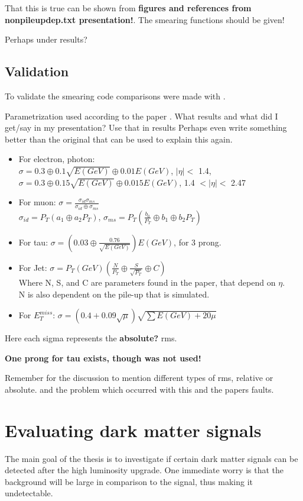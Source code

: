 That this is true can be shown from \textbf{figures and references from nonpileupdep.txt presentation!}. The smearing functions should be given!

Perhaps under results?
\subsection{Validation}
To validate the smearing code comparisons were made with \citep{ATL-PHYS-PUB-2013-004}. 

Parametrization used according to the paper \citep{ATL-PHYS-PUB-2013-004}. What results and what did I get/say in my presentation? Use that in results Perhaps even write something better than the original that can be used to explain this again.

\begin{itemize}
\item For electron, photon:\\
$\sigma=0.3\oplus 0.1\sqrt{E(GeV)}\oplus 0.01E(GeV)$, $|\eta|<$ 1.4, \\
$\sigma=0.3\oplus 0.15\sqrt{E(GeV)}\oplus 0.015E(GeV)$, 1.4 $<|\eta|<$ 2.47 
\item For muon: $\sigma=\frac{\sigma_{id} \sigma_{ms}}{\sigma_{id} \oplus \sigma_{ms}}$\\
$\sigma_{id}=P_T(a_1 \oplus a_2 P_T)$, $\sigma_{ms}=P_T(\frac{b_0}{P_T} \oplus b_1 \oplus b_2 P_T)$
\item For tau: $\sigma =(0.03\oplus \frac{0.76}{\sqrt{E(GeV)}})E(GeV)$, for 3 prong. 
\item For Jet: $\sigma = P_T(GeV)(\frac{N}{P_T} \oplus \frac{S}{\sqrt{P_T}} \oplus C)$ \\
Where N, S, and C are parameters found in the paper, that depend on $\eta$. 
\\N is also dependent on the pile-up that is simulated.
\item For $E_T^{miss}$: $\sigma = (0.4+0.09\sqrt{\mu})\sqrt{\sum E(GeV)+20\mu}$
\end{itemize}
Here each sigma represents the \textbf{absolute?} rms.

\textbf{One prong for tau exists, though was not used!}

Remember for the discussion to mention different types of rms, relative or absolute. and the problem which occurred with this and the papers faults.

\section{Evaluating dark matter signals}
The main goal of the thesis is to investigate if certain dark matter signals can be detected after the high luminosity upgrade. One immediate worry is that the background will be large in comparison to the signal, thus making it undetectable. 

